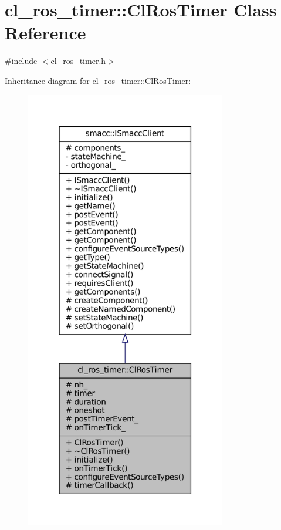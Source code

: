 \hypertarget{classcl__ros__timer_1_1ClRosTimer}{}\section{cl\+\_\+ros\+\_\+timer\+:\+:Cl\+Ros\+Timer Class Reference}
\label{classcl__ros__timer_1_1ClRosTimer}


{\ttfamily \#include $<$cl\+\_\+ros\+\_\+timer.\+h$>$}



Inheritance diagram for cl\+\_\+ros\+\_\+timer\+:\+:Cl\+Ros\+Timer\+:
\nopagebreak
\begin{figure}[H]
\begin{center}
\leavevmode
\includegraphics[height=550pt]{classcl__ros__timer_1_1ClRosTimer__inherit__graph}
\end{center}
\end{figure}



